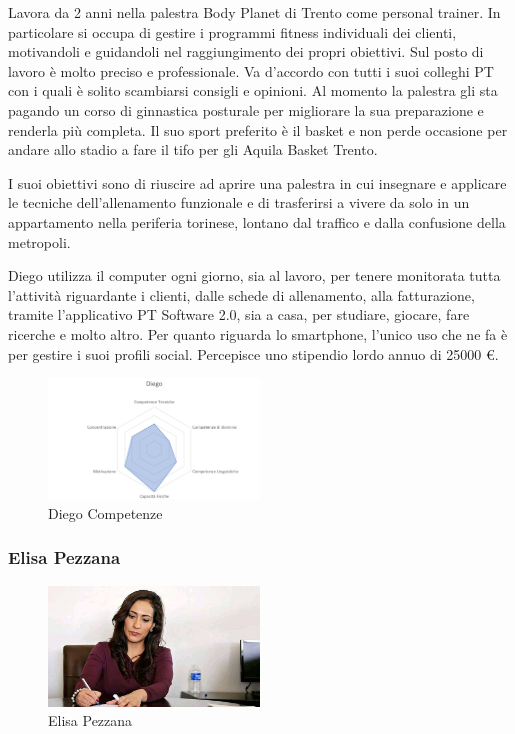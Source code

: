 \documentclass[12pt,italian,]{report}
\begin{document}
Lavora da 2 anni nella palestra Body Planet di Trento come personal
trainer. In particolare si occupa di gestire i programmi fitness
individuali dei clienti, motivandoli e guidandoli nel raggiungimento dei
propri obiettivi. Sul posto di lavoro è molto preciso e professionale.
Va d'accordo con tutti i suoi colleghi PT con i quali è solito
scambiarsi consigli e opinioni. Al momento la palestra gli sta pagando
un corso di ginnastica posturale per migliorare la sua preparazione e
renderla più completa. Il suo sport preferito è il basket e non perde
occasione per andare allo stadio a fare il tifo per gli Aquila Basket
Trento.

I suoi obiettivi sono di riuscire ad aprire una palestra in cui
insegnare e applicare le tecniche dell'allenamento funzionale e di
trasferirsi a vivere da solo in un appartamento nella periferia
torinese, lontano dal traffico e dalla confusione della metropoli.

Diego utilizza il computer ogni giorno, sia al lavoro, per tenere
monitorata tutta l'attività riguardante i clienti, dalle schede di
allenamento, alla fatturazione, tramite l'applicativo PT Software 2.0,
sia a casa, per studiare, giocare, fare ricerche e molto altro. Per
quanto riguarda lo smartphone, l'unico uso che ne fa è per gestire i
suoi profili social. Percepisce uno stipendio lordo annuo di 25000 €.

\begin{figure}[h]
\centering
\includegraphics[width=0.5\textwidth,height=\textheight]{img/diego_competenze.png}
\caption{Diego Competenze}
\end{figure}

\hypertarget{elisa-pezzana-1}{%
\subsubsection{Elisa Pezzana}\label{elisa-pezzana-1}}

\begin{figure}[h]
\centering
\includegraphics[width=0.5\textwidth,height=\textheight]{img/elisa.jpg}
\caption{Elisa Pezzana}
\end{figure}
\end{document}
